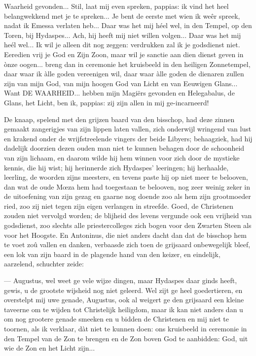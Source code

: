 \documentclass[a4paper, 12pt, oneside, dutch]{article}
\begin{document}
Waarheid gevonden... Stil, laat mij even spreken, pappias: ik vind het heel belangwekkend met je te spreken... Je bent de eerste met wien ik weêr spreek, nadat ik Emessa verlaten heb... Daar was het mij héel wel, in den Tempel, op den Toren, bij Hydaspes... Ach, hij heeft mij niet willen volgen... Daar was het mij heél wel... Ik wil je alleen dit nog zeggen: verdrukken zal ik je godsdienst niet. Eeredien vrij je God en Zijn Zoon, maar wil je sanctie aan dien dienst geven in ònze oogen... breng dan in ceremonie het kruisbeeld in den heiligen Zonnetempel, daar waar ik àlle goden vereenigen wil, daar waar àlle goden de dienaren zullen zijn van mijn God, van mijn hoogen God van Licht en van Eeuwigen Glans... Want DE WAARHEID... hebben mijn Magiërs gevonden en Helegabalus, de Glans, het Licht, ben ik, pappias: zij zijn allen in mij ge-incarneerd!

De knaap, spelend met den grijzen baard van den bisschop, had deze zinnen gemaakt zangerigjes van zijn lippen laten vallen, zich onderwijl wringend van lust en krakend onder de wrijfstreelende vingers der beide Libyers; behaagziek, had hij dadelijk doorzien dezen ouden man niet te kunnen behagen door de schoonheid van zijn lichaam, en daarom wilde hij hem winnen voor zich door de mystieke kennis, die hij wist; hij herinnerde zich Hydaspes' leeringen; hij herhaalde, leerling, de woorden zijns meesters, en tevens paste hij op niet meer te belooven, dan wat de oude Mœza hem had toegestaan te belooven, nog zeer weinig zeker in de uitoefening van zijn gezag en gaarne nog doende zoo als hem zijn grootmoeder ried, zoo zij niet tegen zijn eigen verlangen in streefde. Goed, de Christenen zouden niet vervolgd worden; de blijheid des levens vergunde ook een vrijheid van godsdienst, zoo slechts alle priestercolleges zich bogen voor den Zwarten Steen als voor het Hoogste. En Antoninus, die niet anders dacht dan dat de bisschop hem te voet zoû vallen en danken, verbaasde zich toen de grijsaard onbewegelijk bleef, een lok van zijn baard in de plagende hand van den keizer, en eindelijk, aarzelend, schuchter zeide:

--- Augustus, wel weet ge vele wijze dingen, maar Hydaspes daar ginds heeft, gewis, u de grootste wijsheid nog niet geleerd. Wel zijt ge heel goedertieren, en overstelpt mij uwe genade, Augustus, ook al weigert ge den grijsaard een kleine taveerne om te wijden tot Christelijk heiligdom, maar ik kan niet anders dan u om nog grootere genade smeeken en u bidden de Christenen en mij niet te toornen, als ik verklaar, dàt niet te kunnen doen: ons kruisbeeld in ceremonie in den Tempel van de Zon te brengen en de Zon boven God te aanbidden: God, uit wie de Zon en het Licht zijn...
\end{document}
